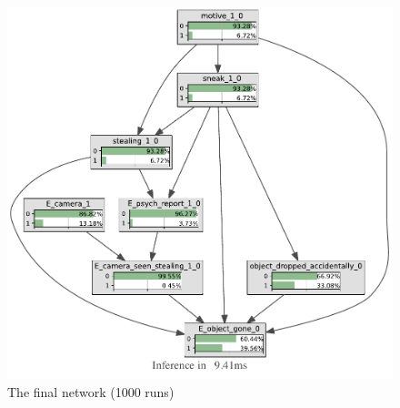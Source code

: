\documentclass[11pt]{article}
\begin{document}
\begin{figure}[htbp]
\begin{center}
\includegraphics[width=\linewidth]{../experiments/GroteMarktPrivate/bnImage/BNIMAGEGroteMarktPrivate.pdf}
\caption{The final network (1000 runs)}
\label{bullet}
\end{center}
\end{figure}
\end{document}
